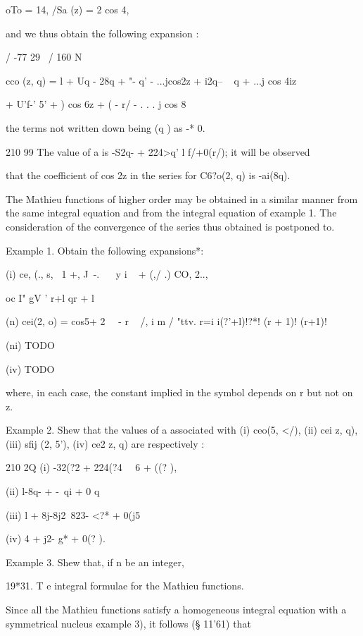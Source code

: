 oTo = 14, /Sa (z) = 2 cos 4,

and we thus obtain the following expansion :

/ -77 29 \ / 160 N

cco (z, q) = l + Uq - 28q + "- q' - ...jcos2z + i2q-- ~ q + ...j cos
4iz

+ U'f-' 5' +  ) cos 6z + ( - r/ - . . . j cos 8

the terms not written down being (q ) as -* 0.

210 99 The value of a is -S2q- + 224>q' l f/+0(r/); it will be
observed

that the coefficient of cos 2z in the series for C6?o(2, q) is
-ai(8q).

%
%

The Mathieu functions of higher order may be obtained in a similar
manner from the same integral equation and from the integral equation
of example 1. The consideration of the convergence of the
series thus obtained is postponed to.

Example 1. Obtain the following expansions*:

(i) ce, (., s, \ 1 +, J\ -. ~ \ y i ~ + (,/  .) CO, 2..,

oc I" gV ' r+l qr + l

(n) cei(2, o) = cos5+ 2 \ \ - r ~ /, i m / "ttv. r=i i(?'+l)!?*! (r +
1)! (r+1)!

(ni) TODO

(iv) TODO

where, in each case, the constant implied in the symbol depends on r
but not on z.


Example 2. Shew that the values of a associated with (i) ceo(5, </),
(ii) cei z, q), (iii) sfij (2, 5'), (iv) ce2 z, q) are respectively :

210 2Q (i) -32(?2 + 224(?4 \ \, 6 + ((? ),

(ii) l-8q- + -\ qi + 0 q%

(iii) l + 8j-8j2\ 823- <?* + 0(j5

(iv) 4 + j2- g* + 0(? ). 

Example 3. Shew that, if n be an integer,

19*31. T e integral formulae for the Mathieu functions.

Since all the Mathieu functions satisfy a homogeneous integral
equation with a symmetrical nucleus  example 3), it follows (§
11'61) that

